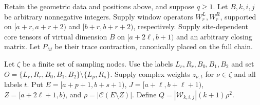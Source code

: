 \begin{lemma}
    \label{thm:common_middle_grid_mpo_family}
    \leanok
    Retain the geometric data and positions above, and suppose $q\ge1$.
    Let $B,k,i,j$ be arbitrary nonnegative integers. Supply window operators
    $W^L_r,W^R_r$, supported on $[a+r,a+r+2)$ and
    $[b+r,b+r+2)$,
    respectively. Supply site-dependent core tensors of virtual dimension $B$
    on $[a+2\ell,b+1)$ and an arbitrary closing matrix. Let $P_M$ be their
    trace contraction, canonically placed on the full chain.

    Let $\zeta$ be a finite set of sampling nodes. Use the labels
    $L_r,R_r,B_0,B_1,B_2$ and set
    $O=\{L_r,R_r,B_0,B_1,B_2\}\setminus\{L_p,R_s\}$.
    Supply complex weights $z_{\nu,t}$ for $\nu\in\zeta$ and all labels $t$.
    Put $E=[a+p+1,b+s+1)$,
    $J=[a+\ell,b+\ell+1)$,
    $Z=[a+2\ell+1,b)$, and $\rho=|\mathcal C(E\setminus Z)|$. Define
    $Q=|\mathcal W_{k,i,j}|(k+1)\rho^2$.


\end{lemma}
